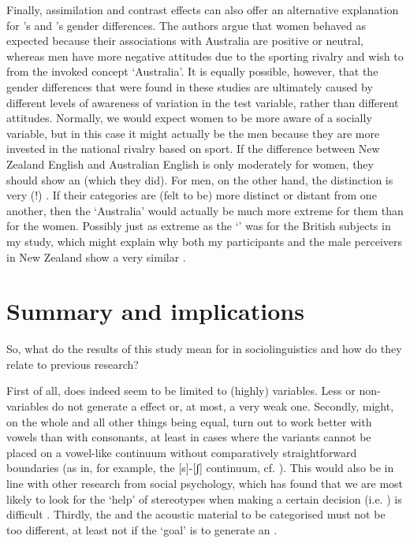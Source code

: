 Finally, assimilation and contrast effects can also offer an alternative explanation for \textcite{hayetal2006a}'s and \textcite{haydrager2010}'s gender differences.
The authors argue that women behaved as expected because their associations with Australia are positive or neutral, whereas men have more negative attitudes due to the sporting rivalry and wish to  from the invoked concept `Australia'.
It is equally possible, however, that the gender differences that were found in these studies are ultimately caused by different levels of awareness of variation in the test variable, rather than different attitudes.
Normally, we would expect women to be more aware of a socially  variable, but in this case it might actually be the men because they are more invested in the national rivalry based on sport.
If the difference between New Zealand English and Australian English is only moderately  for women, they should show an  (which they did).
For men, on the other hand, the distinction is very (!) .
If their categories are (felt to be) more distinct or distant from one another, then the  `Australia' would actually be much more extreme for them than for the women.
Possibly just as extreme as the  `' was for the British subjects in my study, which might explain why both my participants and the male perceivers in New Zealand show a very similar .

	\section{Summary and implications}

So, what do the results of this study mean for   in sociolinguistics and how do they relate to previous research?

First of all,  does indeed seem to be limited to (highly)  variables.
Less or non- variables do not generate a  effect or, at most, a very weak one.
Secondly,  might, on the whole and all other things being equal, turn out to work better with vowels than with consonants, at least in cases where the  variants cannot be placed on a vowel-like continuum without comparatively straightforward boundaries (as in, for example, the [s]-[ʃ] continuum, cf. \citealt{strand1999}).
This would also be in line with other research from social psychology, which has found that we are most likely to look for the `help' of stereotypes when making a certain decision (i.e. ) is difficult \parencite[cf.][28]{petersensix2008}.
Thirdly, the  and the acoustic material to be categorised must not be too different, at least not if the `goal' is to generate an .

